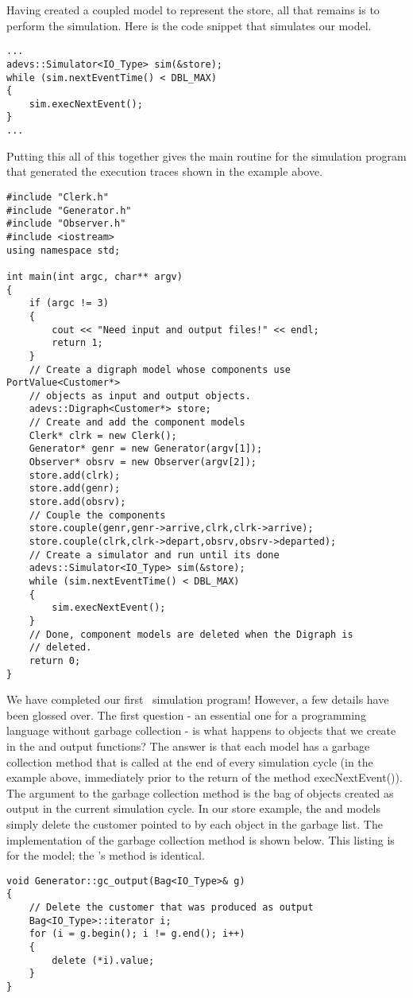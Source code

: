 Having created a coupled model to represent the store, all that remains is to perform the simulation. Here is the code snippet that simulates our model.
\begin{verbatim}
...
adevs::Simulator<IO_Type> sim(&store);
while (sim.nextEventTime() < DBL_MAX)
{
    sim.execNextEvent();
}
...
\end{verbatim}
Putting this all of this together gives the main routine for the simulation program that generated the execution traces shown in the example above.
\begin{verbatim}
#include "Clerk.h"
#include "Generator.h"
#include "Observer.h"
#include <iostream>
using namespace std;

int main(int argc, char** argv)
{
    if (argc != 3)
    {
        cout << "Need input and output files!" << endl;
        return 1;
    }
    // Create a digraph model whose components use PortValue<Customer*>
    // objects as input and output objects.
    adevs::Digraph<Customer*> store;
    // Create and add the component models
    Clerk* clrk = new Clerk();
    Generator* genr = new Generator(argv[1]);
    Observer* obsrv = new Observer(argv[2]);
    store.add(clrk);
    store.add(genr);
    store.add(obsrv);
    // Couple the components
    store.couple(genr,genr->arrive,clrk,clrk->arrive);
    store.couple(clrk,clrk->depart,obsrv,obsrv->departed);
    // Create a simulator and run until its done
    adevs::Simulator<IO_Type> sim(&store);
    while (sim.nextEventTime() < DBL_MAX)
    {
        sim.execNextEvent();
    }
    // Done, component models are deleted when the Digraph is
    // deleted.
    return 0;
}
\end{verbatim}

We have completed our first \adevs\ simulation program! However, a few details have been glossed over. The first question - an essential one for a programming language without garbage collection - is what happens to objects that we create in the  and  output functions? The answer is that each model has a garbage collection method that is called at the end of every simulation cycle (in the example above, immediately prior to the return of the method execNextEvent()). The argument to the garbage collection method is the bag of objects created as output in the current simulation cycle. In our store example, the  and  models simply delete the customer pointed to by each  object in the garbage list. The implementation of the garbage collection method is shown below. This listing is for the  model; the 's  method is identical.
\begin{verbatim}
void Generator::gc_output(Bag<IO_Type>& g)
{
    // Delete the customer that was produced as output
    Bag<IO_Type>::iterator i;
    for (i = g.begin(); i != g.end(); i++)
    {
        delete (*i).value;
    }
}
\end{verbatim}


